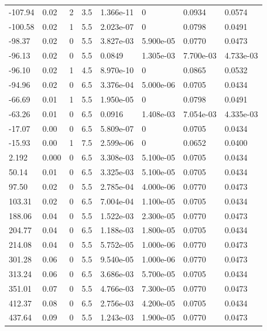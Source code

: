 \documentclass[preview]{standalone}
\begin{document}
{{\begin{tabular}{L{1.2cm}C{1.2cm} C{0.3cm}C{0.5cm} C{1.4cm}C{1.4cm} C{1.4cm}C{1.4cm}}
  -107.94  &  0.02  & 2     & 3.5 &  1.366e-11  & 0  & 0.0934 &  0.0574   \\ 
  -100.58  &  0.02  & 1     & 5.5 &  2.023e-07  & 0  & 0.0798 &  0.0491   \\ 
  -98.37  &  0.02  & 0     & 5.5 &  3.827e-03  & 5.900e-05  & 0.0770 &  0.0473   \\ 
  -96.13  &  0.02  & 0     & 5.5 &  0.0849  & 1.305e-03  & 7.700e-03 &  4.733e-03   \\ 
  -96.10  &  0.02  & 1     & 4.5 &  8.970e-10  & 0  & 0.0865 &  0.0532   \\ 
  -94.96  &  0.02  & 0     & 6.5 &  3.376e-04  & 5.000e-06  & 0.0705 &  0.0434   \\ 
  -66.69  &  0.01  & 1     & 5.5 &  1.950e-05  & 0  & 0.0798 &  0.0491   \\ 
  -63.26  &  0.01  & 0     & 6.5 &  0.0916  & 1.408e-03  & 7.054e-03 &  4.335e-03   \\ 
  -17.07  &  0.00  & 0     & 6.5 &  5.809e-07  & 0  & 0.0705 &  0.0434   \\ 
  -15.93  &  0.00  & 1     & 7.5 &  2.599e-06  & 0  & 0.0652 &  0.0400   \\ 
  2.192  &  0.000  & 0     & 6.5 &  3.308e-03  & 5.100e-05  & 0.0705 &  0.0434   \\ 
  50.14  &  0.01  & 0     & 6.5 &  3.325e-03  & 5.100e-05  & 0.0705 &  0.0434   \\ 
  97.50  &  0.02  & 0     & 5.5 &  2.785e-04  & 4.000e-06  & 0.0770 &  0.0473   \\ 
  103.31  &  0.02  & 0     & 6.5 &  7.004e-04  & 1.100e-05  & 0.0705 &  0.0434   \\ 
  188.06  &  0.04  & 0     & 5.5 &  1.522e-03  & 2.300e-05  & 0.0770 &  0.0473   \\ 
  204.77  &  0.04  & 0     & 6.5 &  1.188e-03  & 1.800e-05  & 0.0705 &  0.0434   \\ 
  214.08  &  0.04  & 0     & 5.5 &  5.752e-05  & 1.000e-06  & 0.0770 &  0.0473   \\ 
  301.28  &  0.06  & 0     & 5.5 &  9.540e-05  & 1.000e-06  & 0.0770 &  0.0473   \\ 
  313.24  &  0.06  & 0     & 6.5 &  3.686e-03  & 5.700e-05  & 0.0705 &  0.0434   \\ 
  351.01  &  0.07  & 0     & 5.5 &  4.766e-03  & 7.300e-05  & 0.0770 &  0.0473   \\ 
  412.37  &  0.08  & 0     & 6.5 &  2.756e-03  & 4.200e-05  & 0.0705 &  0.0434   \\ 
  437.64  &  0.09  & 0     & 5.5 &  1.243e-03  & 1.900e-05  & 0.0770 &  0.0473   \\ 

\end{tabular}}}
\end{document}
